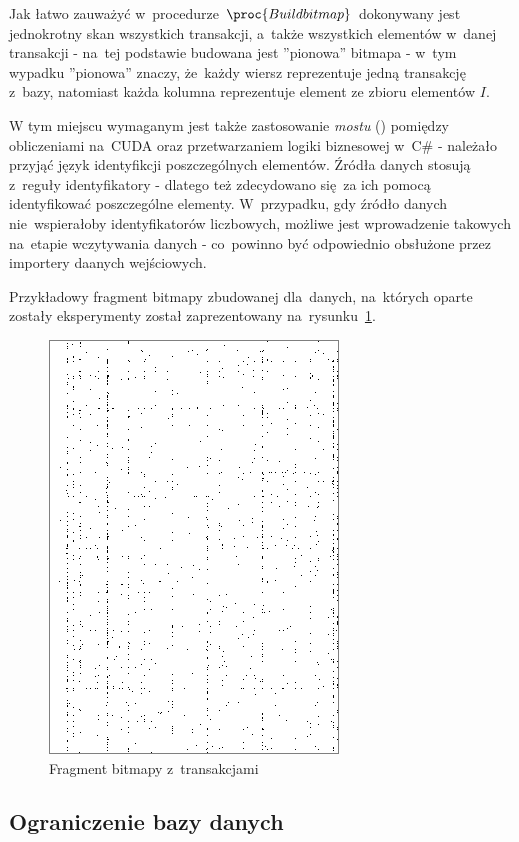 Jak łatwo zauważyć w~procedurze $\proc{Build bitmap}$ dokonywany jest jednokrotny skan wszystkich transakcji, a~także wszystkich elementów w~danej transakcji - na~tej podstawie budowana jest ''pionowa'' bitmapa - w~tym wypadku ''pionowa'' znaczy, że~każdy wiersz reprezentuje jedną transakcję z~bazy, natomiast każda kolumna reprezentuje element ze zbioru elementów $I$.

W tym miejscu wymaganym jest także zastosowanie \emph{mostu} () pomiędzy obliczeniami na~CUDA oraz przetwarzaniem logiki biznesowej w~C\# - należało przyjąć język identyfikcji poszczególnych elementów. Źródła danych stosują z~reguły identyfikatory - dlatego też zdecydowano się~za ich pomocą identyfikować poszczególne elementy. W~przypadku, gdy źródło danych nie~wspierałoby identyfikatorów liczbowych, możliwe jest wprowadzenie takowych na~etapie wczytywania danych - co~powinno być odpowiednio obsłużone przez importery daanych wejściowych.

Przykładowy fragment bitmapy zbudowanej dla~danych, na~których oparte zostały eksperymenty został zaprezentowany na~rysunku~\ref{rys:data_1}.

\begin{figure}[ht]
\centering
\includegraphics{figures/05/data_1.png}
\caption{Fragment bitmapy z~transakcjami}\label{rys:data_1}
\end{figure}

\subsection{Ograniczenie bazy danych}\label{sec:ograniczenie}

